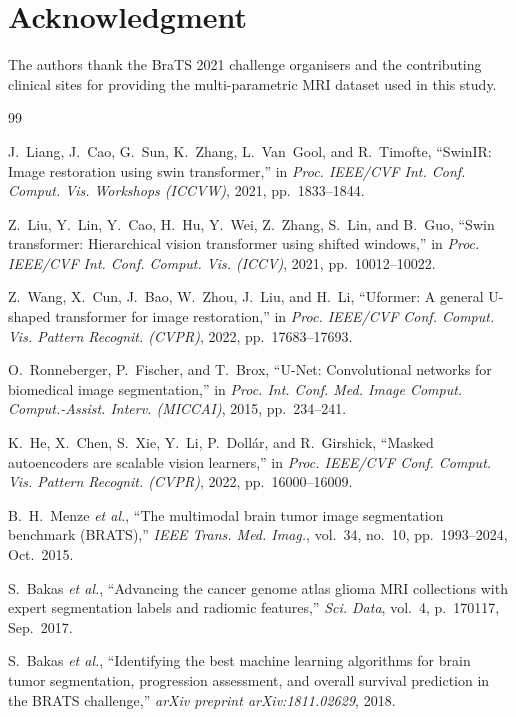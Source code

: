 \documentclass[conference]{IEEEtran}
\begin{document}
\section*{Acknowledgment}
The authors thank the BraTS 2021 challenge organisers and
the contributing clinical sites for providing the multi-parametric
MRI dataset used in this study.



\begin{thebibliography}{99}

J.~Liang, J.~Cao, G.~Sun, K.~Zhang, L.~Van~Gool, and R.~Timofte,
``SwinIR: Image restoration using swin transformer,''
in \textit{Proc. IEEE/CVF Int. Conf. Comput. Vis. Workshops (ICCVW)},
2021, pp.~1833--1844.

Z.~Liu, Y.~Lin, Y.~Cao, H.~Hu, Y.~Wei, Z.~Zhang, S.~Lin, and B.~Guo,
``Swin transformer: Hierarchical vision transformer using shifted windows,''
in \textit{Proc. IEEE/CVF Int. Conf. Comput. Vis. (ICCV)},
2021, pp.~10012--10022.

Z.~Wang, X.~Cun, J.~Bao, W.~Zhou, J.~Liu, and H.~Li,
``Uformer: A general U-shaped transformer for image restoration,''
in \textit{Proc. IEEE/CVF Conf. Comput. Vis. Pattern Recognit. (CVPR)},
2022, pp.~17683--17693.

O.~Ronneberger, P.~Fischer, and T.~Brox,
``U-Net: Convolutional networks for biomedical image segmentation,''
in \textit{Proc. Int. Conf. Med. Image Comput. Comput.-Assist. Interv.
(MICCAI)}, 2015, pp.~234--241.

K.~He, X.~Chen, S.~Xie, Y.~Li, P.~Dollár, and R.~Girshick,
``Masked autoencoders are scalable vision learners,''
in \textit{Proc. IEEE/CVF Conf. Comput. Vis. Pattern Recognit. (CVPR)},
2022, pp.~16000--16009.

B.~H.~Menze \textit{et al.},
``The multimodal brain tumor image segmentation benchmark (BRATS),''
\textit{IEEE Trans. Med. Imag.}, vol.~34, no.~10, pp.~1993--2024,
Oct.\ 2015.

S.~Bakas \textit{et al.},
``Advancing the cancer genome atlas glioma MRI collections with expert
segmentation labels and radiomic features,''
\textit{Sci. Data}, vol.~4, p.~170117, Sep.\ 2017.

S.~Bakas \textit{et al.},
``Identifying the best machine learning algorithms for brain tumor
segmentation, progression assessment, and overall survival prediction
in the BRATS challenge,''
\textit{arXiv preprint arXiv:1811.02629}, 2018.


\end{thebibliography}
\end{document}
